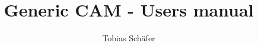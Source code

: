 \documentclass[a4paper,12pt,twoside,fleqn]{report}
\begin{document}
\title{Generic CAM - Users manual}
\author{Tobias Sch{\"a}fer}

\date{\doday}

\maketitle
\pagestyle{empty}
\cleardoublepage

\tableofcontents

%

\newpage
{}
\pagestyle{headings}
\setcounter{page}{1}








%
%
\end{document}
